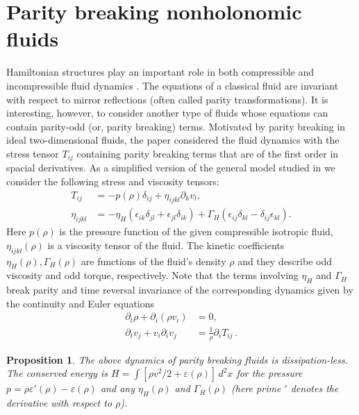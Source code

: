 \documentclass[11pt]{article}
\newtheorem{proposition}[lemma]{Proposition}
\theoremstyle{definition}
\newcounter{ai}
\begin{document}
\section{Parity breaking nonholonomic fluids}
\label{sec:parityfluid}

Hamiltonian structures play an important role in both compressible and incompressible fluid dynamics \cite{zakharov1997hamiltonian,morrison1998hamiltonian}. The equations of a classical fluid are invariant with respect to mirror reflections (often called parity transformations). It is interesting,  however, to consider another type of fluids whose equations can contain  parity-odd (or, parity breaking) terms.
Motivated by parity breaking in ideal two-dimensional fluids, the paper \cite{monteiro2023hamiltonian} considered the fluid dynamics with the stress tensor $T_{ij}$ containing parity breaking terms that are of the first order in spacial derivatives. 
As a simplified version of the general model studied in \cite{monteiro2023hamiltonian} we consider
the following stress and viscosity tensors:
\begin{align}
    T_{ij} &= -p(\rho) \delta_{ij} +\eta_{ijkl}\partial_kv_l,
 \label{stress-100}\\
    \eta_{ijkl} &= -\eta_H(\epsilon_{ik}\delta_{jl}+\epsilon_{jl}\delta_{ik}) +\Gamma_H(\epsilon_{ij}\delta_{kl}-\delta_{ij}\epsilon_{kl}).
 \label{eta-100}
\end{align}
Here $p(\rho)$ is the pressure function of the given compressible isotropic fluid, $\eta_{ijkl}(\rho)$ is a viscosity tensor of the fluid. The kinetic coefficients $\eta_H(\rho), \Gamma_H(\rho)$ are functions of the fluid's density $\rho$ and they describe odd viscosity and odd torque, respectively. 
Note that the terms involving $\eta_H$ and $\Gamma_H$ break parity and time reversal invariance of the corresponding dynamics given by the continuity and  Euler equations
\begin{align}
    \partial_t\rho +\partial_i(\rho v_i) &=0,
 \label{cont-100}\\
    \partial_t v_j +v_i\partial_i v_j &= \frac{1}{\rho} \partial_i T_{ij}\,.
 \label{euler-100}
\end{align}


\begin{proposition}
The above dynamics of parity breaking  fluids is dissipation-less.   
The conserved energy is  $  H =\int  [{\rho v^2}/2 +\varepsilon(\rho) ]\,d^2x$ for  the pressure $p=\rho\varepsilon'(\rho)-\varepsilon(\rho)$ and any 
$\eta_H(\rho)$ and $\Gamma_H(\rho)$  (here  prime $'$ denotes the derivative with respect to $\rho$). 
\end{proposition}
\end{document}
